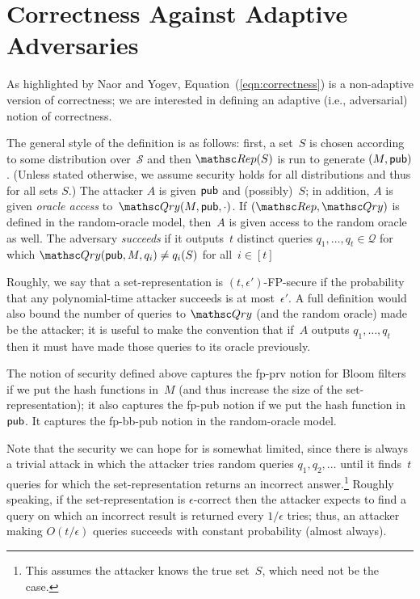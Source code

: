 \section{Correctness Against Adaptive Adversaries}
As highlighted by Naor and Yogev,
Equation~(\ref{eqn:correctness}) is a non-adaptive version of correctness;
we are interested in defining an adaptive (i.e., adversarial) notion
of correctness. 

The general style of the definition is as follows:
first, a set~$S$ is chosen according to some distribution over~$\mathcal{S}$ and then
$\Rep(S)$ is run to generate $(M,{\sf pub})$. (Unless stated otherwise, we assume
security holds for all distributions and thus for all sets $S$.)
The attacker $A$ is given ${\sf pub}$ and (possibly)~$S$;
in addition, $A$ is given \emph{oracle access} to~$\Qry(M,\aux,\cdot)$.
If $(\Rep, \Qry)$ is defined in the random-oracle model, then~$A$ is given access to the random oracle as well.
The adversary \emph{succeeds} if it outputs~$t$ distinct queries $q_1, \ldots, q_t \in \mathcal{Q}$ for which
$\Qry(\aux, M, q_i) \neq q_i(S)$ for all~$i \in [t]$

Roughly, we say that a set-representation is $(t,\epsilon')$-FP-secure if the probability that
any polynomial-time attacker succeeds is at most~$\epsilon'$. 
A full definition would also bound the number of queries to $\Qry$ (and the random oracle) made
be the attacker; it is useful to make the convention that if~$A$ outputs
$q_1, \ldots, q_t$ then it must have made those queries to its oracle previously.

The notion of security defined above captures the fp-prv notion for Bloom filters
if we put the hash functions in~$M$ (and thus increase the size of the set-representation); it also captures the fp-pub
notion if we put the hash function in~${\sf pub}$. 
It captures the fp-bb-pub notion in the random-oracle model.

Note that the security we can hope for is somewhat limited, since there
is always a trivial attack in which
the attacker tries random queries $q_1, q_2, \ldots$ until it finds~$t$ queries for which the
set-representation returns an incorrect answer.\footnote{This assumes the attacker
knows the true set~$S$, which need not be the case.} Roughly speaking,
if the set-representation is $\epsilon$-correct then the attacker expects to find a query on which
an incorrect result is returned every $1/\epsilon$ tries; thus, an
attacker making $O(t/\epsilon)$ queries succeeds with constant probability (almost always).

